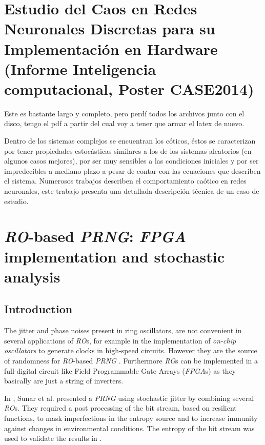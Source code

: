 
\section{Estudio del Caos en Redes Neuronales Discretas para su Implementación en Hardware (Informe Inteligencia computacional, Poster CASE2014)}

Este es bastante largo y completo, pero perdí todos los archivos junto con el disco, tengo el pdf a partir del cual voy a tener que armar el latex de nuevo.

Dentro de los sistemas complejos se encuentran los cóticos, éstos se caracterizan por tener
propiedades estocásticas similares a los de los sistemas aleatorios (en algunos casos mejores),
por ser muy sensibles a las condiciones iniciales y por ser impredecibles a mediano plazo a
pesar de contar con las ecuaciones que describen el sistema. Numerosos trabajos describen el
comportamiento caótico en redes neuronales, este trabajo presenta una detallada descripción
técnica de un caso de estudio.



\section{\emph{RO}-based \emph{PRNG}: \emph{FPGA} implementation and stochastic analysis}

\subsection{Introduction}

The jitter and phase noises present in ring oscillators, are not
convenient in several applications of \emph{RO}s, for example in the implementation of \emph{on-chip oscillators} to generate clocks in high-speed circuits\cite{Hajimiri1999,Mandal2010,Gupta2011}. However they are the source of randomness for \emph{RO}-based \emph{PRNG} \cite{Sunar2007,Wold2009}. Furthermore \emph{RO}s can be implemented in a full-digital circuit like Field Programmable Gate Arrays (\emph{FPGA}s) as they  basically are just a string of inverters.


In \cite{Sunar2007}, Sunar et al. presented a \emph{PRNG} using
stochastic jitter by combining several \emph{RO}s. They required a
post processing of the bit stream, based on resilient functions,
to mask imperfections in the entropy source and to increase
immunity against changes in environmental conditions. The entropy of the bit stream was used to
validate the results in \cite{Sunar2007}.


